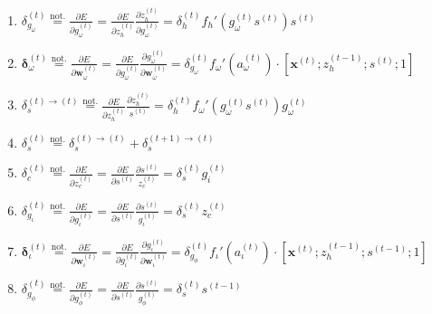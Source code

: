 \documentclass[11pt]{article}
\begin{document}
\begin{enumerate}
    \item $\delta_{g_{\omega}}^{(t)} \overset{\text{not.}}{=} \displaystyle \frac{\partial E}{\partial g_{\omega}^{(t)}} = \displaystyle \frac{\partial E}{\partial z_{h}^{(t)}} \displaystyle \frac{\partial z_h^{(t)}}{\partial g_{\omega}^{(t)}} = \delta_h^{(t)}f_h'\left(g_{\omega}^{(t)}s^{(t)}\right)s^{(t)}$
    \item $\boldsymbol{\delta}_{\omega}^{(t)} \overset{\text{not.}}{=} \displaystyle \frac{\partial E}{\partial \boldsymbol{w}_{\omega}^{(t)}} = \displaystyle \frac{\partial E}{\partial g_{\omega}^{(t)}} \displaystyle \frac{\partial g_{\omega}^{(t)}}{\partial \boldsymbol{w}_{\omega}^{(t)}} = \delta_{g_{\omega}}^{(t)} f_{\omega}'\left(a_{\omega}^{(t)}\right) \cdot \left[\mathbf{x}^{(t)}; z_{h}^{(t-1)}; s^{(t)}; 1\right]$
    \item $\delta_s^{(t)\rightarrow(t)} \overset{\text{not.}}{=} \displaystyle \frac{\partial E}{\partial z_h^{(t)}}  \displaystyle \frac{\partial z_h^{(t)}}{s^{(t)}} = \delta_{h}^{(t)} f_{\omega}'(g_{\omega}^{(t)}s^{(t)}) g_{\omega}^{(t)}$
    \item $\delta_s^{(t)} \overset{\text{not.}}{=} \delta^{(t) \rightarrow (t)}_s + \delta^{(t+1) \rightarrow (t)}_s$
    \item $\delta_c^{(t)} \overset{\text{not.}}{=} \displaystyle \frac{\partial E}{\partial z_c^{(t)}} = \displaystyle \frac{\partial E}{\partial s^{(t)}}  \displaystyle \frac{\partial s^{(t)}}{z_c^{(t)}} = \delta_s^{(t)} g_i^{(t)}$
    \item $\delta_{g_{\iota}}^{(t)} \overset{\text{not.}}{=} \displaystyle \frac{\partial E}{\partial g_{\iota}^{(t)}} = \displaystyle \frac{\partial E}{\partial s^{(t)}}  \displaystyle \frac{\partial s^{(t)}}{g_{\iota}^{(t)}} = \delta_s^{(t)} z_c^{(t)}$
    \item $\boldsymbol{\delta}_{\iota}^{(t)} \overset{\text{not.}}{=} \displaystyle \frac{\partial E}{\partial \boldsymbol{w}_{\iota}^{(t)}} = \displaystyle \frac{\partial E}{\partial g_{\iota}^{(t)}} \displaystyle \frac{\partial g_{\iota}^{(t)}}{\partial \boldsymbol{w}_{\iota}^{(t)}} = \delta_{g_{\phi}}^{(t)} f_{\iota}'\left(a_{\iota}^{(t)}\right) \cdot \left[\mathbf{x}^{(t)}; z_{h}^{(t-1)}; s^{(t-1)}; 1\right]$
    \item $\delta_{g_{\phi}}^{(t)} \overset{\text{not.}}{=} \displaystyle \frac{\partial E}{\partial g_{\phi}^{(t)}} = \displaystyle \frac{\partial E}{\partial s^{(t)}}  \displaystyle \frac{\partial s^{(t)}}{g_{\phi}^{(t)}} = \delta_s^{(t)} s^{(t-1)}$

\end{enumerate}
\end{document}
